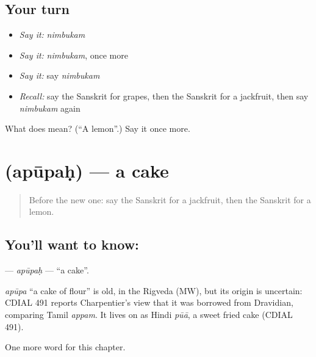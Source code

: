 \subsection*{Your turn}
\begin{itemize}
\raggedright
  \item \emph{Say it:} \emph{nimbukam}
  \item \emph{Say it:} \emph{nimbukam}, once more
  \item \emph{Say it:} say \emph{nimbukam}
  \item \emph{Recall:} say the Sanskrit for grapes, then the Sanskrit for a jackfruit, then say \emph{nimbukam} again
\end{itemize}

\begin{tcolorbox}[breakable,colback=teal!4,colframe=teal!35!black,title={Before you move on}]
What does  mean? (\textquotedblleft{}A lemon\textquotedblright{}.) Say it once more.
\end{tcolorbox}
\section[\texorpdfstring{\sk{अपूपः} (apūpaḥ)}{अपूपः (apūpaḥ)}]{ (apūpaḥ) — a cake}

\label{lesson:SA-C109-apupah}



\begin{quote}
Before the new one: say the Sanskrit for a jackfruit, then the Sanskrit for a lemon.
\end{quote}

\subsection*{You'll want to know: }
\textbf{} — \emph{apūpaḥ} — \textquotedblleft{}a cake\textquotedblright{}.

\begin{cousinweb}
\emph{apūpa} \textquotedblleft{}a cake of flour\textquotedblright{} is old, in the Rigveda (MW), but its origin is uncertain: CDIAL 491 reports Charpentier's view that it was borrowed from Dravidian, comparing Tamil \emph{appam}. It lives on as Hindi \emph{pūā}, a sweet fried cake (CDIAL 491).
\end{cousinweb}

\begin{grammarlens}[title={What you've built}]
One more word for this chapter.
\end{grammarlens}

